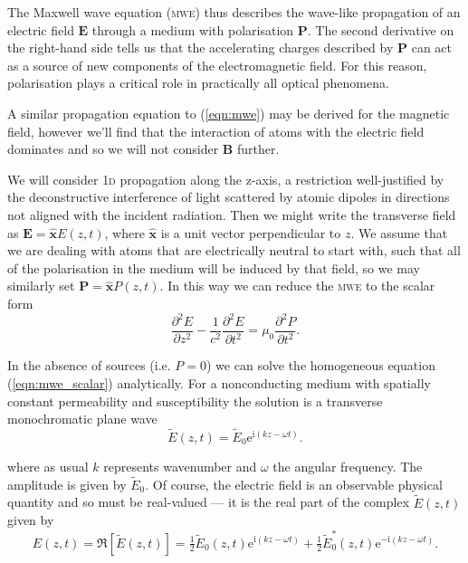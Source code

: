     The Maxwell wave equation (\textsc{mwe}) thus describes the wave-like
    propagation of an electric field $\mathbf{E}$ through a medium with
    polarisation $\mathbf{P}$. The second derivative on the right-hand side
    tells us that the accelerating charges described by $\mathbf{P}$ can act as
    a source of new components of the electromagnetic field. For this reason,
    polarisation plays a critical role in practically all optical
    phenomena.\cite{boyd2008nonlinear}

    A similar propagation equation to (\ref{eqn:mwe}) may be derived for the
    magnetic field, however we'll find that the interaction of atoms with the
    electric field dominates and so we will not consider $\mathbf{B}$ further.

    We will consider \textsc{1d} propagation along the z-axis, a restriction
    well-justified by the deconstructive interference of light scattered by
    atomic dipoles in directions not aligned with the incident
    radiation\cite{hecht2015optics}. Then we might write the transverse field as
    $\mathbf{E} = \hat{\mathbf{x}} E(z, t)$, where $\hat{\mathbf{x}}$ is a unit
    vector perpendicular to $z$. We assume that we are dealing with atoms that
    are electrically neutral to start with, such that all of the polarisation in
    the medium will be induced by that field, so we may similarly set
    $\mathbf{P} = \hat{\mathbf{x}} P(z, t)$. In this way we can reduce the
    \textsc{mwe} to the scalar form
    \begin{equation}
      \frac{\partial^2 E}{\partial z^2} - \frac{1}{c^2} \frac{\partial^2
        E}{\partial t^2} =    \mu_0 \frac{\partial^2 P}{\partial t^2}.
      \label{eqn:mwe_scalar} 
    \end{equation}

    In the absence of sources (i.e. $P = 0$) we can solve the homogeneous
    equation (\ref{eqn:mwe_scalar}) analytically. For a nonconducting medium
    with spatially constant permeability and susceptibility the solution is a
    transverse monochromatic plane wave\cite{jackson1998classical}
    \begin{equation}
      \tilde{E}(z,t) = \tilde{E}_0 \mathrm{e}^{\mathrm{i}(k z - \omega t)}.
      \label{eqn:plane_waves}
    \end{equation}

    where as usual $k$ represents wavenumber and $\omega$ the angular frequency.
    The amplitude is given by $\tilde{E}_0$. Of course, the electric field is an
    observable physical quantity and so must be real-valued --- it is the real
    part of the complex $\tilde{E}(z,t)$ given by
    \begin{equation}
      E(z,t) = \Re[\tilde{E}(z,t)] = \tfrac{1}{2} \tilde{E}_0(z,t) 
                    \mathrm{e}^{\mathrm{i}(k z - \omega t)} 
                + \tfrac{1}{2} \tilde{E}_0^*(z,t) 
                    \mathrm{e}^{-\mathrm{i}(k z - \omega t)}.
    \end{equation}

